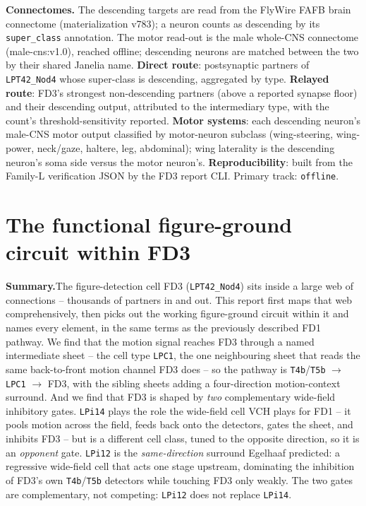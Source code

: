 \documentclass[11pt]{article}
\newcommand{\ttt}[1]{\texttt{#1}}
\begin{document}
\textbf{Connectomes.} The descending targets are read from the FlyWire FAFB brain connectome (materialization v783); a neuron counts as descending by its \ttt{super\_class} annotation. The motor read-out is the male whole-CNS connectome (male-cns:v1.0), reached offline; descending neurons are matched between the two by their shared Janelia name. \textbf{Direct route}: postsynaptic partners of \ttt{LPT42\_Nod4} whose super-class is descending, aggregated by type. \textbf{Relayed route}: FD3's strongest non-descending partners (above a reported synapse floor) and their descending output, attributed to the intermediary type, with the count's threshold-sensitivity reported. \textbf{Motor systems}: each descending neuron's male-CNS motor output classified by motor-neuron subclass (wing-steering, wing-power, neck/gaze, haltere, leg, abdominal); wing laterality is the descending neuron's soma side versus the motor neuron's. \textbf{Reproducibility}: built from the Family-L verification JSON by the FD3 report CLI. Primary track: \ttt{offline}.

\clearpage\part{The functional figure-ground circuit within FD3}

\textbf{Summary.}\quad The figure-detection cell FD3 (\ttt{LPT42\_Nod4}) sits inside a large web of connections -- thousands of partners in and out. This report first maps that web comprehensively, then picks out the working figure-ground circuit within it and names every element, in the same terms as the previously described FD1 pathway. We find that the motion signal reaches FD3 through a named intermediate sheet -- the cell type \ttt{LPC1}, the one neighbouring sheet that reads the same back-to-front motion channel FD3 does -- so the pathway is \ttt{T4b}/\ttt{T5b} $\rightarrow$ \ttt{LPC1} $\rightarrow$ FD3, with the sibling sheets adding a four-direction motion-context surround. And we find that FD3 is shaped by \emph{two} complementary wide-field inhibitory gates. \ttt{LPi14} plays the role the wide-field cell VCH plays for FD1 -- it pools motion across the field, feeds back onto the detectors, gates the sheet, and inhibits FD3 -- but is a different cell class, tuned to the opposite direction, so it is an \emph{opponent} gate. \ttt{LPi12} is the \emph{same-direction} surround Egelhaaf predicted: a regressive wide-field cell that acts one stage upstream, dominating the inhibition of FD3's own \ttt{T4b}/\ttt{T5b} detectors while touching FD3 only weakly. The two gates are complementary, not competing: \ttt{LPi12} does not replace \ttt{LPi14}.
\end{document}
